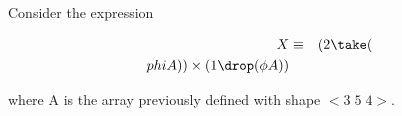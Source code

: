 
Consider the expression

\begin{eqnarray}
X & \equiv & (2 \take ( \\phi A)) \times ( 1 \drop (\phi A)) \\
\end{eqnarray}

where A is the array previously defined with shape $<3\;5\;4>$.